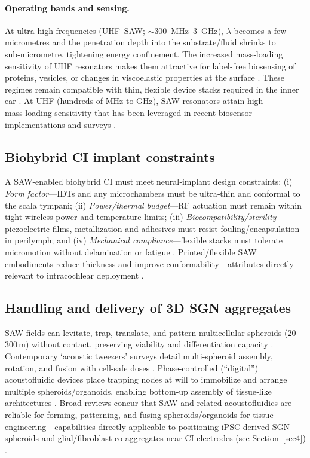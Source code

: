 \documentclass[referee,pdflatex, sn-vancouver-num]{sn-jnl}%
\theoremstyle{thmstyleone}%
\theoremstyle{thmstyletwo}%
\theoremstyle{thmstylethree}%
\begin{document}
\paragraph{Operating bands and sensing.}
At ultra‑high frequencies (UHF–SAW; \(\sim\)300~MHz–3~GHz), \(\lambda\) becomes a few micrometres and the penetration depth into the substrate/fluid shrinks to sub‑micrometre, tightening energy confinement. The increased mass‑loading sensitivity of UHF resonators makes them attractive for label‑free biosensing of proteins, vesicles, or changes in viscoelastic properties at the surface \cite{Agostini2021_UHFSAW}. These regimes remain compatible with thin, flexible device stacks required in the inner ear \cite{Campbell1998}. At UHF (hundreds of MHz to GHz), SAW resonators attain high mass‑loading sensitivity that has been leveraged in recent biosensor implementations and surveys \cite{Wang2023_Sensors_SAWBiosensors}.

\subsection{Biohybrid CI implant constraints}
A SAW‑enabled biohybrid CI must meet neural‑implant design constraints: (i) \textit{Form factor}—IDTs and any microchambers must be ultra‑thin and conformal to the scala tympani; (ii) \textit{Power/thermal budget}—RF actuation must remain within tight wireless‑power and temperature limits; (iii) \textit{Biocompatibility/sterility}—piezoelectric films, metallization and adhesives must resist fouling/encapsulation in perilymph; and (iv) \textit{Mechanical compliance}—flexible stacks must tolerate micromotion without delamination or fatigue \cite{Campbell1998,Ding2013,Mandal2022,Friend2011,Yeo2014_SAWmicrofluidics,Gedge2012_SAW,TrolierMcKinstry2004_PiezoMEMS,Dagdeviren2014_ConformalPiezo,Cogan2008_NeuralElectrodes,Merrill2005_Waveforms,Sewell2009,ISO14708-7:2016_CI,ISO10993-1_2018_Biocompatibility,Agostini2021_UHFSAW}. Printed/flexible SAW embodiments reduce thickness and improve conformability—attributes directly relevant to intracochlear deployment \cite{Rich2024_MicroNano}.

\subsection{Handling and delivery of 3D SGN aggregates}
SAW fields can levitate, trap, translate, and pattern multicellular spheroids (20–300\,\textmu m) without contact, preserving viability and differentiation capacity \cite{rufo2022}. Contemporary ‘acoustic tweezers’ surveys detail multi‑spheroid assembly, rotation, and fusion with cell‑safe doses \cite{Wu2024_MicroNano}. Phase‑controlled (``digital'') acoustofluidic devices place trapping nodes at will to immobilize and arrange multiple spheroids/organoids, enabling bottom‑up assembly of tissue‑like architectures \cite{Cai2020_Biofabrication}. Broad reviews concur that SAW and related acoustofluidics are reliable for forming, patterning, and fusing spheroids/organoids for tissue engineering—capabilities directly applicable to positioning iPSC‑derived SGN spheroids and glial/fibroblast co‑aggregates near CI electrodes (see Section~\ref{sec4}) \cite{Wu2022_EngRegen,Wu2024_MicroNano,Zhang2020_AcousticMicrofluidics,Gedge2012_SAW}.
\end{document}

